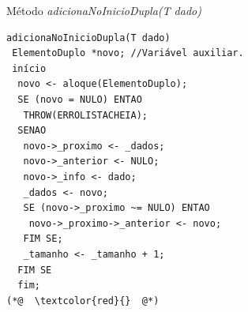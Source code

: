 \documentclass[12pt,table,xcolor={dvipsnames}]{beamer}
\begin{document}
\begin{frame}[fragile]{Método \textit{adicionaNoInicioDupla(T dado)}}
\begin{lstlisting}
adicionaNoInicioDupla(T dado)
 ElementoDuplo *novo; //Variável auxiliar.
 início
  novo <- aloque(ElementoDuplo);
  SE (novo = NULO) ENTAO
   THROW(ERROLISTACHEIA);
  SENAO
   novo->_proximo <- _dados;
   novo->_anterior <- NULO;
   novo->_info <- dado;
   _dados <- novo;
   SE (novo->_proximo ~= NULO) ENTAO
    novo->_proximo->_anterior <- novo;
   FIM SE;
   _tamanho <- _tamanho + 1;
  FIM SE
  fim;
(*@  \textcolor{red}{}  @*)
\end{lstlisting}
\end{frame}
\end{document}
